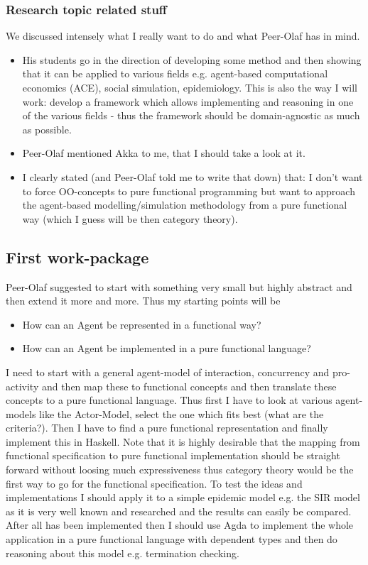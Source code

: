 \subsubsection*{Research topic related stuff}
We discussed intensely what I really want to do and what Peer-Olaf has in mind.

\begin{itemize}
\item His students go in the direction of developing some method and then showing that it can be applied to various fields e.g. agent-based computational economics (ACE), social simulation, epidemiology. This is also the way I will work: develop a framework which allows implementing and reasoning in one of the various fields - thus the framework should be domain-agnostic as much as possible.
\item Peer-Olaf mentioned Akka to me, that I should take a look at it.
\item I clearly stated (and Peer-Olaf told me to write that down) that: I don't want to force OO-concepts to pure functional programming but want to approach the agent-based modelling/simulation methodology from a pure functional way (which I guess will be then category theory).
\end{itemize}

\subsection*{First work-package}
Peer-Olaf suggested to start with something very small but highly abstract and then extend it more and more. Thus my starting points will be

\begin{itemize}
\item How can an Agent be represented in a functional way?
\item How can an Agent be implemented in a pure functional language?
\end{itemize}

I need to start with a general agent-model of interaction, concurrency and pro-activity and then map these to functional concepts and then translate these concepts to a pure functional language. Thus first I have to look at various agent-models like the Actor-Model, select the one which fits best (what are the criteria?). Then I have to find a pure functional representation and finally implement this in Haskell. Note that it is highly desirable that the mapping from functional specification to pure functional implementation should be straight forward without loosing much expressiveness thus category theory would be the first way to go for the functional specification. To test the ideas and implementations I should apply it to a simple epidemic model e.g. the SIR model as it is very well known and researched and the results can easily be compared. After all has been implemented then I should use Agda to implement the whole application in a pure functional language with dependent types and then do reasoning about this model e.g. termination checking.

